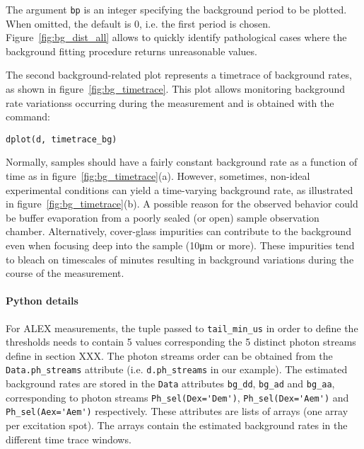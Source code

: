 The argument \verb|bp| is an integer specifying the background period to be plotted.
When omitted, the default is 0, i.e. the first period is chosen.
Figure~\ref{fig:bg_dist_all} allows to quickly identify pathological cases where the 
background fitting procedure returns unreasonable values. 

The second background-related plot represents a timetrace of background rates, 
as shown in figure~\ref{fig:bg_timetrace}. This plot allows monitoring background rate variationss
occurring during the measurement and is obtained with the command:

\begin{lstlisting}
dplot(d, timetrace_bg)
\end{lstlisting}

Normally, samples should have a fairly constant background rate as a function of time
as in figure~\ref{fig:bg_timetrace}(a). However, sometimes, non-ideal
experimental conditions can yield a time-varying background rate, as illustrated in
figure~\ref{fig:bg_timetrace}(b).
A possible reason for the observed behavior could be buffer evaporation from a poorly sealed (or open) sample observation chamber. Alternatively,
cover-glass impurities can contribute to the background even when focusing 
deep into the sample (10μm or more).
These impurities tend to bleach on timescales of minutes resulting in
background variations during the course of the measurement.
\paragraph{Python details} For ALEX measurements, the tuple passed to
\verb|tail_min_us| in order to define the thresholds needs to contain  
5 values corresponding the 5 distinct photon streams define in section XXX.
The photon streams order can be obtained from
the \verb|Data.ph_streams| attribute (i.e. \verb|d.ph_streams| in our example).
The estimated background rates are stored in the \verb|Data| attributes
\verb|bg_dd|, \verb|bg_ad| and \verb|bg_aa|, corresponding to photon
streams \verb|Ph_sel(Dex='Dem')|, \verb|Ph_sel(Dex='Aem')| and \verb|Ph_sel(Aex='Aem')|
respectively.
These attributes are lists of arrays (one array per excitation spot).
The arrays contain the estimated background rates in the different time trace windows.


